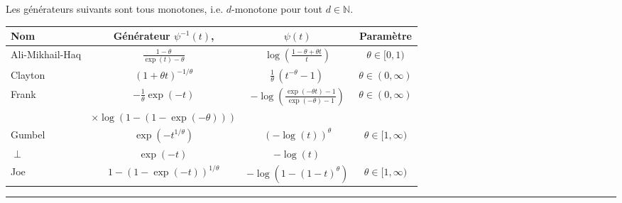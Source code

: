 \begin{f}[Copule]
Les générateurs suivants sont tous monotones, i.e. \(d\)-monotone pour tout \(d\in\mathbb{N}\).

\footnotesize
\renewcommand\arraystretch{1.3}
\begin{tabular}{|m{10mm}|ccc|}	\rowcolor{BleuProfondIRA!40} 
	\hline
 Nom 		& Générateur \(\psi^{-1}(t)\), 	& \(\psi(t)\) &	Paramètre\\
	\hline
	Ali-Mikhail-Haq 	&\(\frac{1-\theta}{\exp(t)-\theta} \)	
	&\(\log\left(\frac{1-\theta+\theta t}{t}\right)\) 	
	&\(\theta\in[0,1)\)\\
	Clayton		&\(\left(1+\theta t\right)^{-1/\theta} 	\)
	&\(\frac1\theta\,(t^{-\theta}-1)\, 	\)
	&\(\theta\in(0,\infty)\)\\
	Frank 		&\(-\frac{1}{\theta}\exp(-t)\)
	&\(-\log\left(\frac{\exp(-\theta t)-1}{\exp(-\theta)-1}\right)\)
	&\(\theta\in(0,\infty)\)\\
	&\(\times\log(1-(1-\exp(-\theta)))\)
	&
	&\\
	Gumbel 		&\(\exp\left(-t^{1/\theta}\right) \)	
	&\(\left(-\log(t)\right)^\theta\)	
	&\(\theta\in[1,\infty)\)\\
	\(\perp\) 	&\(\exp(-t)\,\)
	&\(-\log(t)\,\) 	
	& \\
	Joe		&\(1-\left(1-\exp(-t)\right)^{1/\theta}\)
	&\(-\log\left(1-(1-t)^\theta\right)\)
	&\(\theta\in[1,\infty)\)\\
	\hline
\end{tabular}
\renewcommand\arraystretch{1}
\end{f}
\hrule


